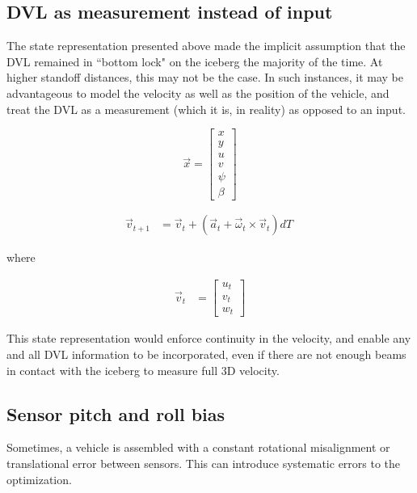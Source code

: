 \subsection{DVL as measurement instead of input}

The state representation presented above made the implicit assumption that the DVL remained in ``bottom lock" on the iceberg the majority of the time. At higher standoff distances, this may not be the case. In such instances, it may be advantageous to model the velocity as well as the position of the vehicle, and treat the DVL as a measurement (which it is, in reality) as opposed to an input.

\begin{equation}
\label{eq.state}
\vec{x}= \left[\begin{array}{c}
                     x \\ y \\ u \\ v \\ \psi \\ \beta 
                     \end{array}\right]
\end{equation}

\begin{align}
\vec{v}_{t+1} &= \vec{v}_t + \left( \vec{a}_t + \vec{\omega}_t \times \vec{v}_t \right)dT\
\end{align}

where

\begin{align}
\vec{v}_{t} &=  \left[\begin{array}{c}
                     u_t \\ v_t \\ w_t
                     \end{array}\right]
\end{align}

This state representation would enforce continuity in the velocity, and enable any and all DVL information to be incorporated, even if there are not enough beams in contact with the iceberg to measure full 3D velocity.

\subsection{Sensor pitch and roll bias}

Sometimes, a vehicle is assembled with a constant rotational misalignment or translational error between sensors. This can introduce systematic errors to the optimization.

